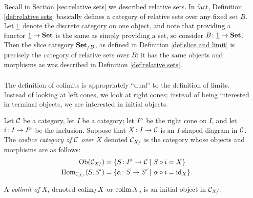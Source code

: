 \documentclass[CT4S-EN-RU]{subfiles}
\begin{document}
\begin{exampleRUS}\label{ex:product version of nat trans}
\end{exampleRUS}

\begin{remarkENG}
Recall in Section \ref{sec:relative sets} we described relative sets. In fact, Definition \ref{def:relative sets} basically defines a category of relative sets over any fixed set $B$. Let $\underline{1}$ denote the discrete category on one object, and note that providing a functor $\underline{1}\rightarrow{\mathbf{Set}}$ is the same as simply providing a set, so consider $B\colon\underline{1}\rightarrow{\mathbf{Set}}$. Then the slice category ${\mathbf{Set}}_{/B}$, as defined in Definition \ref{def:slice and limit} is precisely the category of relative sets over $B$: it has the same objects and morphisms as was described in Definition \ref{def:relative sets}.
\end{remarkENG}

\begin{remarkRUS}
\end{remarkRUS}


\subsubsection{}

\begin{blockENG}
The definition of colimits is appropriately “dual” to the definition of limits. Instead of looking at left cones, we look at right cones; instead of being interested in terminal objects, we are interested in initial objects.
\end{blockENG}

\begin{blockRUS}
\end{blockRUS}

\begin{definitionENG}\label{def:coslice and colimit}
Let $\mathcal{C}$ be a category, let $I$ be a category; let $I^\triangleright$ be the right cone on $I$, and let $i\colon I\rightarrow I^\triangleright$ be the inclusion. Suppose that $X\colon I\rightarrow\mathcal{C}$ is an $I$-shaped diagram in $\mathcal{C}$. The {\em coslice category of $\mathcal{C}$ over $X$} denoted $\mathcal{C}_{X/}$ is the category whose objects and morphisms are as follows:
\begin{align*}
\textnormal{Ob}(\mathcal{C}_{X/})&=\{S\colon I^\triangleright\rightarrow\mathcal{C}{\;|\;}S\circ i=X\}\\
\textnormal{Hom}_{\mathcal{C}_{X/}}(S,S')&=\{\alpha\colon S\rightarrow S'{\;|\;}\alpha\circ i=\textnormal{id}_X\}.
\end{align*}

A {\em colimit of $X$}, denoted $\mathop{\textnormal{colim}}_IX$ or $\mathop{\textnormal{colim}} X$, is an initial object in $\mathcal{C}_{X/}$.
\end{definitionENG}
\end{document}
